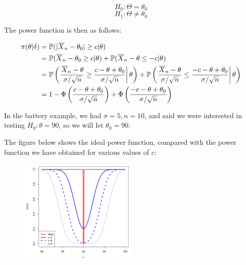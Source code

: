 \documentclass[a4paper]{article}
\begin{document}
                \[
                    H_0: \Theta = \theta_0
                \]
                \[
                    H_1: \Theta \neq \theta_0
                \]

                The power function is then as follows:

                \begin{align*}
                    \pi(\theta | \delta) & = \mathbb{P}(|\overline X_n - \theta_0|
                        \geq c | \theta) \\
                    & = \mathbb{P}(\overline X_n - \theta_0 \geq c | \theta) +
                        \mathbb{P}(\overline X_n - \theta \leq -c | \theta) \\
                    & = \mathbb{P}\left(\left.\frac{\overline X_n - \theta}{\sigma/
                        \sqrt{n}} \geq \frac{c - \theta + \theta_0}{\sigma/
                        \sqrt{n}}\right|\theta\right) + \mathbb{P}\left(\left.
                        \frac{\overline X_n - \theta}{\sigma/\sqrt{n}} \leq
                        \frac{-c - \theta + \theta_0}{\sigma/\sqrt{n}}\right|
                        \theta\right) \\
                    & = 1 - \Phi\left(\frac{c - \theta + \theta_0}
                        {\sigma/\sqrt{n}}\right) + \Phi\left(\frac{-c - \theta +
                        \theta_0}{\sigma/\sqrt{n}}\right)
                \end{align*}

                In the battery example, we had $\sigma = 5, n = 10$, and said we
                were interested in testing $H_0: \theta = 90$, so we will let
                $\theta_0 = 90$.

                The figure below shows the ideal power function, compared with
                the power function we have obtained for various values of $c$:

                \begin{figure}[ht]
                    \centering
                    \includegraphics[width=0.5\textwidth]
                    {./figures/powerfunction.png}
                \end{figure}

    
\end{document}
